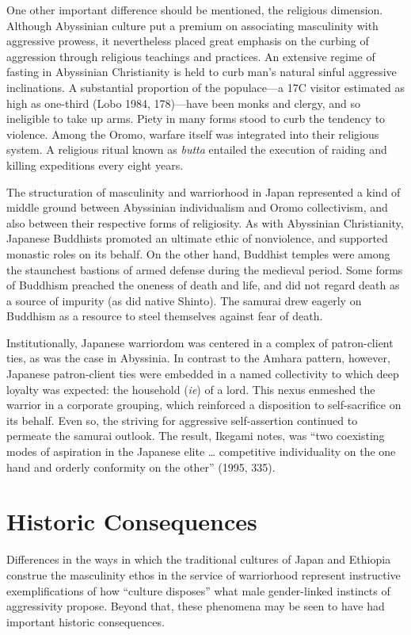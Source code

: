One other important difference should be mentioned, the religious dimension. Although Abyssinian culture put a premium on associating masculinity with aggressive prowess, it nevertheless placed great emphasis on the curbing of aggression through religious teachings and practices. An extensive regime of fasting in Abyssinian Christianity is held to curb man's natural sinful aggressive inclinations. A substantial proportion of the populace---a 17C visitor estimated as high as one-third (Lobo 1984, 178)---have been monks and clergy, and so ineligible to take up arms. Piety in many forms stood to curb the tendency to violence. Among the Oromo, warfare itself was integrated into their religious system. A religious ritual known as \emph{butta} entailed the execution of raiding and killing expeditions every eight years. 

The structuration of masculinity and warriorhood in Japan represented a kind of middle ground between Abyssinian individualism and Oromo collectivism, and also between their respective forms of religiosity. As with Abyssinian Christianity, Japanese Buddhists promoted an ultimate ethic of nonviolence, and supported monastic roles on its behalf. On the other hand, Buddhist temples were among the staunchest bastions of armed defense during the medieval period. Some forms of Buddhism preached the oneness of death and life, and did not regard death as a source of impurity (as did native Shinto). The samurai drew eagerly on Buddhism as a resource to steel themselves against fear of death. 

Institutionally, Japanese warriordom was centered in a complex of patron-client ties, as was the case in Abyssinia. In contrast to the Amhara pattern, however, Japanese patron-client ties were embedded in a named collectivity to which deep loyalty was expected: the household (\emph{ie}) of a lord. This nexus enmeshed the warrior in a corporate grouping, which reinforced a disposition to self-sacrifice on its behalf. Even so, the striving for aggressive self-assertion continued to permeate the samurai outlook. The result, Ikegami notes, was ``two coexisting modes of aspiration in the Japanese elite \ldots{} competitive individuality on the one hand and orderly conformity on the other'' (1995, 335). 

\section*{Historic Consequences}

Differences in the ways in which the traditional cultures of Japan and Ethiopia construe the masculinity ethos in the service of warriorhood represent instructive exemplifications of how ``culture disposes'' what male gender-linked instincts of aggressivity propose. Beyond that, these phenomena may be seen to have had important historic consequences. 

